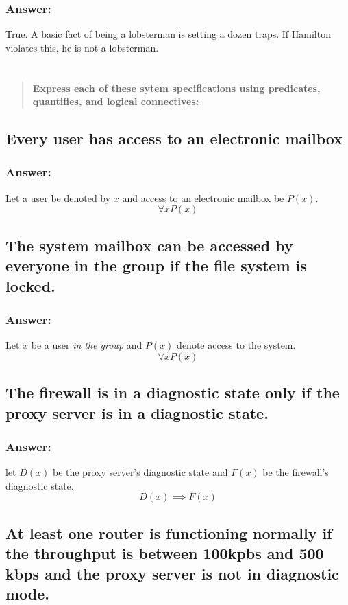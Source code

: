\documentclass[titlepage]{article}\usepackage[]{graphicx}\usepackage[]{color}
\begin{document}
\subsubsection{Answer:}
True. A basic fact of being a lobsterman is setting a dozen traps. If Hamilton
violates this, he is not a lobsterman. 



\section{}
\begin{quote}
  \textbf{Express each of these sytem specifications using predicates,
  quantifies, and logical connectives:}
\end{quote}
  \subsection{ Every user has access to an electronic mailbox }
  \subsubsection{Answer:}
  Let a user be denoted by $x$ and access to an electronic mailbox be $P(x)$.
  \[ \forall x P(x) \]


  \subsection{ The system mailbox can be accessed by everyone in the group if
  the file system is locked. }
  \subsubsection{Answer:}
  Let $x$ be a user \textit{in the group} and $P(x)$ denote access to the system.
  \[ \forall x P(x) \]

  \subsection{ The firewall is in a diagnostic state only if the proxy server
  is in  a diagnostic state. }
  \subsubsection{Answer:}
  let $D(x)$ be the proxy server's diagnostic state and $F(x)$ be the
  firewall's diagnostic state.
  \[ D(x) \implies F(x) \]

  \subsection{ At least one router is functioning normally if the throughput is
  between 100kpbs and 500 kbps and the proxy server is not in diagnostic
  mode.}
\end{document}
